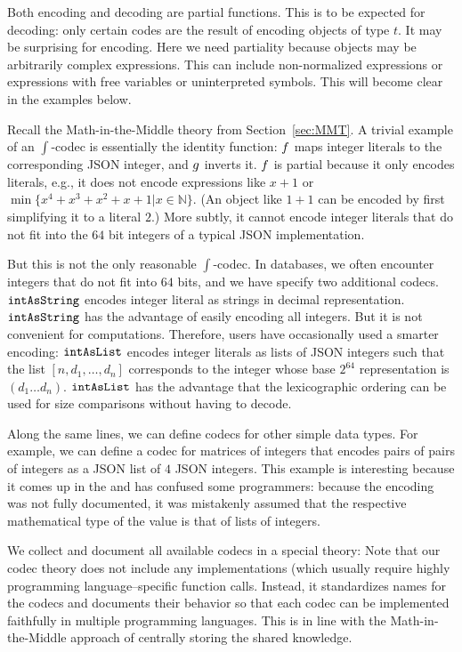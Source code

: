 Both encoding and decoding are partial functions.
This is to be expected for decoding: only certain codes are the result of encoding objects of type $t$.
It may be surprising for encoding.
Here we need partiality because \MMT objects may be arbitrarily complex expressions.
This can include non-normalized expressions or expressions with free variables or uninterpreted symbols.
This will become clear in the examples below.

Recall the Math-in-the-Middle theory from Section~\ref{sec:MMT}.
A trivial example of an $\int$-codec is essentially the identity function: $f$ maps integer literals to the corresponding JSON integer, and $g$ inverts it.
$f$ is partial because it only encodes literals, e.g., it does not encode expressions like $x+1$ or $\min \{x^4+x^3+x^2+x+1|x\in \mathbb{N}\}$.
(An object like $1+1$ can be encoded by first simplifying it to a literal $2$.)
More subtly, it cannot encode integer literals that do not fit into the $64$ bit integers of a typical JSON implementation.

But this is not the only reasonable $\int$-codec.
In \LMFDB databases, we often encounter integers that do not fit into $64$ bits, and we have specify two additional codecs.
$\texttt{intAsString}$ encodes integer literal as strings in decimal representation.
$\texttt{intAsString}$ has the advantage of easily encoding all integers.
But it is not convenient for computations.
Therefore, \LMFDB users have occasionally used a smarter encoding: $\texttt{intAsList}$ encodes integer literals as lists of JSON integers such that the list $[n,d_1,\ldots,d_n]$ corresponds to the integer whose base $2^{64}$ representation is $(d_1\ldots d_n)$.
$\texttt{intAsList}$ has the advantage that the lexicographic ordering can be used for size comparisons without having to decode.

Along the same lines, we can define codecs for other simple data types.
For example, we can define a codec for matrices of integers that encodes pairs of pairs of integers as a JSON list of $4$ JSON integers.
This example is interesting because it comes up in the \LMFDB and has confused some programmers: because the encoding was not fully documented, it was mistakenly assumed that the respective mathematical type of the value is that of lists of integers.

We collect and document all available codecs in a special \MMT theory:
Note that our codec theory does not include any implementations (which usually require highly programming language--specific function calls.
Instead, it standardizes names for the codecs and documents their behavior so that each codec can be implemented faithfully in multiple programming languages.
This is in line with the Math-in-the-Middle approach of centrally storing the shared knowledge.

